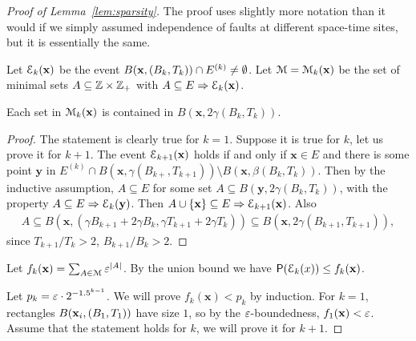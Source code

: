 \documentclass[11pt]{memoir}
\theoremstyle{definition} %
\renewcommand{\le}{\leq}
\renewcommand{\vek}[1]{\mathbf{#1}}
\def\B{B}
\newcommand{\Tu}{T}
\newcommand{\x}{\vek{x}} %
\newcommand{\y}{\vek{y}} %
\begin{document}
\begin{proof}[Proof of Lemma~\ref{lem:sparsity}]
  The proof uses slightly more notation than it would if we simply assumed independence
  of faults at different space-time sites, but it is essentially the same.

  Let \( \cE_{k}(\x) \) be the event  \( B(\x,\pair{\B_{k}}{\Tu_{k}})\cap E^{(k)}\neq\emptyset \).
  Let \( \cM=\cM_{k}(\x) \) be the set of minimal sets \( A\subseteq \mathbb{Z}\times\mathbb{Z}_{+} \)
with  \( A\subseteq E\imp \cE_{k}(\x) \).

  \begin{claim}
    Each set in \( \cM_{k}(\x) \) is contained in \( B(\x,2\gamma(\B_{k},\Tu_{k})) \).
  \end{claim}
  \begin{proof}
    The statement is clearly true for \( k=1 \).
    Suppose it is true for \( k \), let us prove it for \( k+1 \).
    The event \( \cE_{k+1}(\x) \) holds if and only if \( \x\in E \) and there is some point \( \y \)
    in \( E^{(k)}\cap B(\x,\gamma(\B_{k+},\Tu_{k+1}))\setminus B(\x,\beta(\B_{k},\Tu_{k})) \).
    Then by the inductive assumption, \( A\subseteq E \) for some
    set \( A\subseteq B(\y,2\gamma(\B_{k},\Tu_{k})) \),
    with the property \( A\subseteq E\imp \cE_{k}(\y) \).
    Then \( A\cup\{\x\}\subseteq E\imp \cE_{k+1}(\x) \).
    Also 
\begin{align*}
  A\subseteq B(\x,(\gamma\B_{k+1}+2\gamma\B_{k},\gamma\Tu_{k+1}+2\gamma\Tu_{k}))
\subseteq B(\x,2\gamma(\B_{k+1},\Tu_{k+1})),
\end{align*}
since \( \Tu_{k+1}/\Tu_{k}> 2 \), \( \B_{k+1}/\B_{k}> 2 \).
\end{proof}

Let \(  f_{k}(\x)= \sum_{A\in\cM}\eps^{|A|} \).
By the union bound we have \( \Prob(\cE_{k}(x))\le f_{k}(\x) \).

Let \( p_{k}= \varepsilon\cdot 2^{-1.5^{k-1}} \).
We will prove \(   f_{k}(\x) < p_{k} \) by induction.
For \( k=1 \), rectangles \( B(\x_{i},\pair{\B_{1}}{\Tu_{1}}) \) have size \( 1 \), so
by the \( \varepsilon \)-boundedness, \( f_{1}(\x)<\eps \).
 Assume that the statement holds for \( k \), we will prove it for \( k+1 \).


\end{proof}
\end{document}
